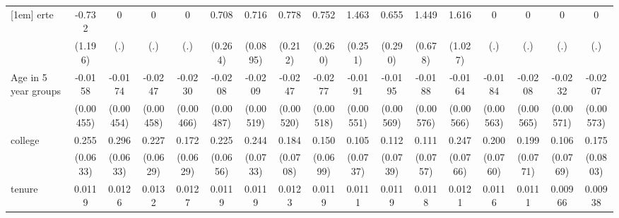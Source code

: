 {\begin{tabular}{l*{16}{c}}
[1em]
erte                &      -0.732         &           0         &           0         &           0         &       0.708\sym{**} &       0.716\sym{***}&       0.778\sym{***}&       0.752\sym{**} &       1.463\sym{***}&       0.655\sym{*}  &       1.449\sym{*}  &       1.616         &           0         &           0         &           0         &           0         \\
                    &     (1.196)         &         (.)         &         (.)         &         (.)         &     (0.264)         &    (0.0895)         &     (0.212)         &     (0.260)         &     (0.251)         &     (0.290)         &     (0.678)         &     (1.027)         &         (.)         &         (.)         &         (.)         &         (.)         \\
[1em]
Age in 5 year groups&     -0.0158\sym{***}&     -0.0174\sym{***}&     -0.0247\sym{***}&     -0.0230\sym{***}&     -0.0208\sym{***}&     -0.0209\sym{***}&     -0.0247\sym{***}&     -0.0277\sym{***}&     -0.0191\sym{***}&     -0.0195\sym{***}&     -0.0188\sym{**} &     -0.0164\sym{**} &     -0.0184\sym{**} &     -0.0208\sym{***}&     -0.0232\sym{***}&     -0.0207\sym{***}\\
                    &   (0.00455)         &   (0.00454)         &   (0.00458)         &   (0.00466)         &   (0.00487)         &   (0.00519)         &   (0.00520)         &   (0.00518)         &   (0.00551)         &   (0.00569)         &   (0.00576)         &   (0.00566)         &   (0.00563)         &   (0.00565)         &   (0.00571)         &   (0.00573)         \\
[1em]
college             &       0.255\sym{***}&       0.296\sym{***}&       0.227\sym{***}&       0.172\sym{**} &       0.225\sym{***}&       0.244\sym{***}&       0.184\sym{**} &       0.150\sym{*}  &       0.105         &       0.112         &       0.111         &       0.247\sym{**} &       0.200\sym{**} &       0.199\sym{**} &       0.106         &       0.175\sym{*}  \\
                    &    (0.0633)         &    (0.0633)         &    (0.0629)         &    (0.0629)         &    (0.0656)         &    (0.0733)         &    (0.0708)         &    (0.0699)         &    (0.0737)         &    (0.0739)         &    (0.0757)         &    (0.0766)         &    (0.0760)         &    (0.0771)         &    (0.0769)         &    (0.0803)         \\
[1em]
tenure              &      0.0119\sym{***}&      0.0126\sym{***}&      0.0132\sym{***}&      0.0127\sym{***}&      0.0119\sym{***}&      0.0119\sym{***}&      0.0123\sym{***}&      0.0119\sym{***}&      0.0111\sym{***}&      0.0119\sym{***}&      0.0118\sym{***}&      0.0121\sym{***}&      0.0116\sym{***}&      0.0111\sym{***}&     0.00966\sym{***}&     0.00938\sym{***}\\

\end{tabular}}

